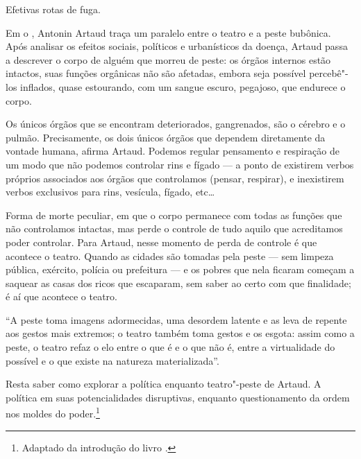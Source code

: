 Efetivas rotas de fuga.

{}

Em o {}, Antonin Artaud traça um paralelo entre o
teatro e a peste bubônica. Após analisar os efeitos sociais, políticos e
urbanísticos da doença, Artaud passa a descrever o corpo de alguém que
morreu de peste: os órgãos internos estão intactos, suas funções
orgânicas não são afetadas, embora seja possível percebê"-los inflados,
quase estourando, com um sangue escuro, pegajoso, que endurece o corpo.

Os únicos órgãos que se encontram deteriorados, gangrenados, são o
cérebro e o pulmão. Precisamente, os dois únicos órgãos que dependem
diretamente da vontade humana, afirma Artaud. Podemos regular
pensamento e respiração de um modo que não podemos controlar rins e
fígado --- a ponto de existirem verbos próprios associados aos órgãos que
controlamos (pensar, respirar), e inexistirem verbos exclusivos para
rins, vesícula, fígado, etc\ldots{}

Forma de morte peculiar, em que o corpo permanece com todas as funções
que não controlamos intactas, mas perde o controle de tudo aquilo que
acreditamos poder controlar. Para Artaud, nesse momento de perda de
controle é que acontece o teatro. Quando as cidades são tomadas pela
peste --- sem limpeza pública, exército, polícia ou prefeitura ---
e os pobres que nela ficaram começam a saquear as casas dos ricos que
escaparam, sem saber ao certo com que finalidade; é aí que acontece o
teatro.

``A peste toma imagens adormecidas, uma desordem latente e as leva de
repente aos gestos mais extremos; o teatro também toma gestos e os
esgota: assim como a peste, o teatro refaz o elo entre o que é e o que
não é, entre a virtualidade do possível e o que existe na natureza
materializada''.

Resta saber como explorar a política enquanto teatro"-peste de Artaud. A
política em suas potencialidades disruptivas, enquanto questionamento da
ordem nos moldes do poder.\footnote[1]{Adaptado da introdução do livro {}.}

\blankpage